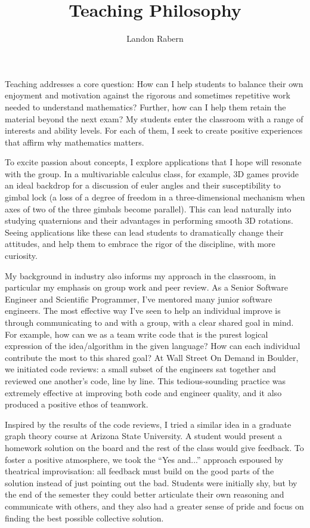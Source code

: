 \documentclass[12pt]{article}
\title{Teaching Philosophy}
\author{Landon Rabern}
\date{}
\begin{document}
\maketitle
Teaching addresses a core question: How can I help students to balance
their own enjoyment and motivation against the rigorous and sometimes repetitive
work needed to understand mathematics?
Further, how can I help them retain the material beyond the next
exam?  My students enter the classroom with a range of interests and
ability levels.  For each of them, I seek to create positive experiences that
affirm why mathematics matters.

To excite passion about concepts, I explore applications that I hope will
resonate with the group.  In a multivariable calculus class, for example, 3D
games provide an ideal backdrop for a discussion of euler angles and their
susceptibility to gimbal lock (a loss of a degree of freedom in a
three-dimensional mechanism when axes of two of the three gimbals become
parallel).  This can lead naturally into studying
quaternions and their advantages in performing smooth 3D rotations. 
Seeing applications like these can lead students to dramatically change their
attitudes, and help them to embrace the rigor of the discipline, with more
curiosity. 

My background in industry also informs my approach in the classroom, in particular
my emphasis on group work and peer review. As a Senior Software Engineer and
Scientific Programmer, I've mentored many junior software engineers. 
The most effective way I've seen to help an individual improve is through
communicating to and with a group, with a clear shared goal in mind. 
For example, how can we as a team write code that is the purest logical
expression of the idea/algorithm in the given language? 
How can each individual contribute the most to this shared goal? 
At Wall Street On Demand in Boulder, we initiated code reviews: 
a small subset of the engineers sat together and reviewed one another's code,
line by line. This tedious-sounding practice was extremely effective at
improving both code and engineer quality, 
and it also produced a positive ethos of teamwork. 

Inspired by the results of the code reviews, I tried a similar idea in a
graduate graph theory course at Arizona State University. 
A student would present a homework solution on the board and the rest of the
class would give feedback. 
To foster a positive atmosphere, we took the ``Yes and...'' approach espoused
by theatrical improvisation: all feedback must build on the
good parts of the solution instead of just pointing out the bad. 
Students were initially shy, but by the end of the semester they could better 
articulate their own reasoning and communicate with others, and they also
had a greater sense of pride and focus on finding the best possible
collective solution. 
\end{document}
